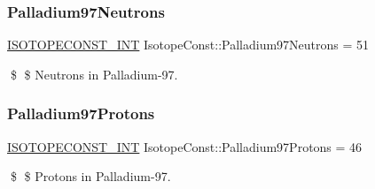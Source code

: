 \subsubsection{\texorpdfstring{Palladium97\+Neutrons}{Palladium97Neutrons}}
{\footnotesize\ttfamily \mbox{\hyperlink{group___isotope_const-_macros_ga5f18360b3e99483a35c32d789e62621c}{I\+S\+O\+T\+O\+P\+E\+C\+O\+N\+S\+T\+\_\+\+I\+NT}} Isotope\+Const\+::\+Palladium97\+Neutrons = 51}

\$ \$ Neutrons in Palladium-\/97. \mbox{\label{group___isotope_const-_palladium-_pd97_ga5d39628a4133b6afd8e2bba682aaae97}} 
\subsubsection{\texorpdfstring{Palladium97\+Protons}{Palladium97Protons}}
{\footnotesize\ttfamily \mbox{\hyperlink{group___isotope_const-_macros_ga5f18360b3e99483a35c32d789e62621c}{I\+S\+O\+T\+O\+P\+E\+C\+O\+N\+S\+T\+\_\+\+I\+NT}} Isotope\+Const\+::\+Palladium97\+Protons = 46}

\$ \$ Protons in Palladium-\/97. 